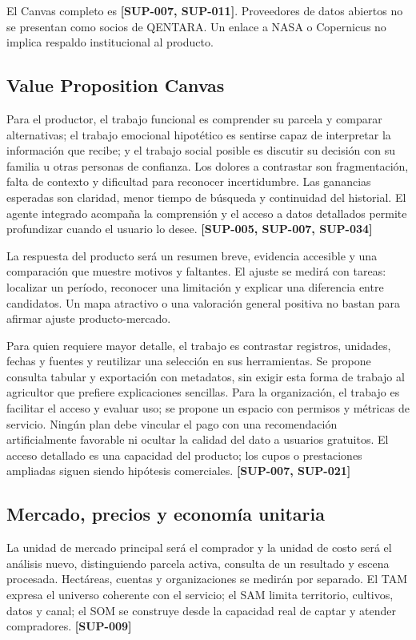 \documentclass[10pt,a4paper]{article}
\begin{document}
El Canvas completo es \textbf{[SUP-007, SUP-011]}. Proveedores de datos abiertos no se presentan como socios de QENTARA. Un enlace a NASA o Copernicus no implica respaldo institucional al producto.


\subsection{Value Proposition Canvas}

Para el productor, el trabajo funcional es comprender su parcela y comparar alternativas; el trabajo emocional hipotético es sentirse capaz de interpretar la información que recibe; y el trabajo social posible es discutir su decisión con su familia u otras personas de confianza. Los dolores a contrastar son fragmentación, falta de contexto y dificultad para reconocer incertidumbre. Las ganancias esperadas son claridad, menor tiempo de búsqueda y continuidad del historial. El agente integrado acompaña la comprensión y el acceso a datos detallados permite profundizar cuando el usuario lo desee. \textbf{[SUP-005, SUP-007, SUP-034]}


La respuesta del producto será un resumen breve, evidencia accesible y una comparación que muestre motivos y faltantes. El ajuste se medirá con tareas: localizar un período, reconocer una limitación y explicar una diferencia entre candidatos. Un mapa atractivo o una valoración general positiva no bastan para afirmar ajuste producto-mercado.


Para quien requiere mayor detalle, el trabajo es contrastar registros, unidades, fechas y fuentes y reutilizar una selección en sus herramientas. Se propone consulta tabular y exportación con metadatos, sin exigir esta forma de trabajo al agricultor que prefiere explicaciones sencillas. Para la organización, el trabajo es facilitar el acceso y evaluar uso; se propone un espacio con permisos y métricas de servicio. Ningún plan debe vincular el pago con una recomendación artificialmente favorable ni ocultar la calidad del dato a usuarios gratuitos. El acceso detallado es una capacidad del producto; los cupos o prestaciones ampliadas siguen siendo hipótesis comerciales. \textbf{[SUP-007, SUP-021]}


\subsection{Mercado, precios y economía unitaria}

La unidad de mercado principal será el comprador y la unidad de costo será el análisis nuevo, distinguiendo parcela activa, consulta de un resultado y escena procesada. Hectáreas, cuentas y organizaciones se medirán por separado. El TAM expresa el universo coherente con el servicio; el SAM limita territorio, cultivos, datos y canal; el SOM se construye desde la capacidad real de captar y atender compradores. \textbf{[SUP-009]}
\end{document}
